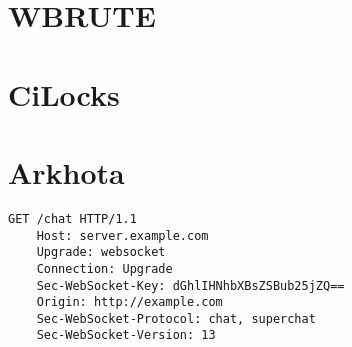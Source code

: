 \section{WBRUTE}

\section{CiLocks}

\section{Arkhota}




\begin{lstlisting}[caption={Esempio di listing}, style=javaScriptCode]
	GET /chat HTTP/1.1
	Host: server.example.com
	Upgrade: websocket
	Connection: Upgrade
	Sec-WebSocket-Key: dGhlIHNhbXBsZSBub25jZQ==
	Origin: http://example.com
	Sec-WebSocket-Protocol: chat, superchat
	Sec-WebSocket-Version: 13
\end{lstlisting} 


